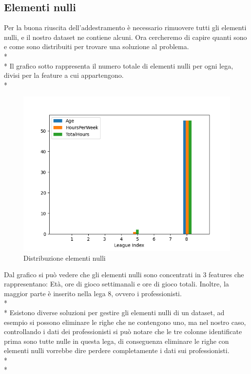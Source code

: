 \subsection{Elementi nulli}\label{ssec:nulli}
\normalsize
\par
Per la buona riuscita dell’addestramento è necessario rimuovere tutti gli elementi nulli, e il nostro dataset ne contiene alcuni. Ora cercheremo di capire quanti sono e come sono distribuiti per trovare una soluzione al problema.\\*\\*
Il grafico sotto rappresenta il numero totale di elementi nulli per ogni lega, divisi per la feature a cui appartengono.\\*
\begin{figure}[h]
	\includegraphics[scale=0.9]{../figures/Nan_distribuzione.PNG}
	\caption{Distribuzione elementi nulli}
\end{figure}
\par
Dal grafico si può vedere che gli elementi nulli sono concentrati in 3 features che rappresentano: Età, ore di gioco settimanali e ore di gioco totali. Inoltre, la maggior parte è inserito nella lega 8, ovvero i professionisti. \\*\\*
Esistono diverse soluzioni per gestire gli elementi nulli di un dataset, ad esempio si possono eliminare le righe che ne contengono uno, ma nel nostro caso, controllando i dati dei professionisti si può notare che le tre colonne identificate prima sono tutte nulle in questa lega, di conseguenza eliminare le righe con elementi nulli vorrebbe dire perdere completamente i dati sui professionisti.\\*\\*
